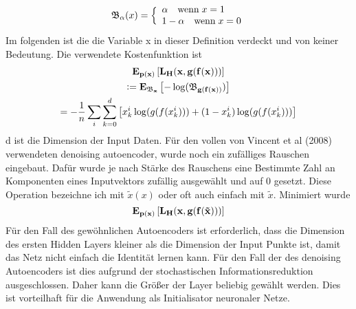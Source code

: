 \documentclass[12pt]{article}
\begin{document}
\begin{gather*}\mathfrak{B}_\alpha(x)=\Bigl\{\begin{array}{l}\alpha\quad\text{wenn}\;x=1\\
    1-\alpha\quad\text{wenn}\;x=0\end{array}\end{gather*}
Im folgenden ist die die Variable x in dieser Definition verdeckt und von keiner Bedeutung. Die verwendete Kostenfunktion ist
\begin{gather*}
    \bf{E}_{p(x)}\left[L_H(x,g(f(x)))\right]\\
    \vcentcolon=\bf{E}_{\mathfrak{B}_x}\left[-\log(\mathfrak{B}_{g(f(x))})\right]\\
    =-\frac{1}{n}\sum_i\sum_{k=0}^d\left[x_k^i\log(g(f(x_k^i)))+(1-x_k^i)\log(g(f(x_k^i)))\right]
\end{gather*}
d ist die Dimension der Input Daten. Für den vollen von Vincent et al (2008) verwendeten denoising autoencoder, wurde noch ein zufälliges Rauschen eingebaut. Dafür wurde je nach Stärke des Rauschens eine Bestimmte Zahl an Komponenten eines Inputvektors zufällig ausgewählt und auf 0 gesetzt. Diese Operation bezeichne ich mit $\tilde{x}(x)$ oder oft auch einfach mit $\tilde{x}$. Minimiert wurde 
$$\bf{E}_{p(x)}\left[L_H(x,g(f(\tilde{x})))\right]$$
Für den Fall des gewöhnlichen Autoencoders ist erforderlich, dass die Dimension des ersten Hidden Layers kleiner als die Dimension der Input Punkte ist, damit das Netz nicht einfach die Identität lernen kann. Für den Fall der des denoising Autoencoders ist dies aufgrund der stochastischen Informationsreduktion ausgeschlossen. Daher kann die Größer der Layer beliebig gewählt werden. Dies ist vorteilhaft für die Anwendung als Initialisator neuronaler Netze. 
\end{document}
